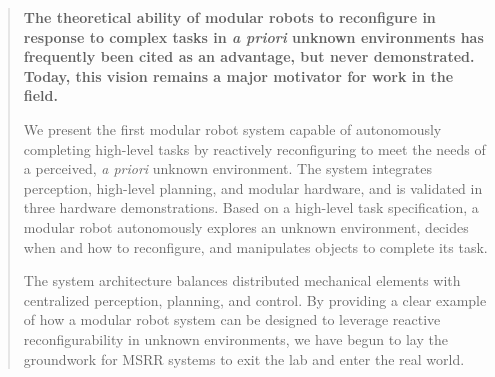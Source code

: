\documentclass[12pt]{article}
\newenvironment{sciabstract}{%
\begin{quote} \bf}
{\end{quote}}
\begin{document}



\maketitle 

%
\begin{sciabstract}
%
The theoretical ability of modular robots to reconfigure in response to complex tasks in \textit{a priori} unknown environments has frequently been cited as an advantage, but never demonstrated. Today, this vision remains a major motivator for work in the field.

We present the first modular robot system capable of autonomously completing high-level tasks by reactively reconfiguring to meet the needs of a perceived, \textit{a priori} unknown environment.  The system integrates perception, high-level planning, and modular hardware, and is validated in three hardware demonstrations. Based on a high-level task specification, a modular robot autonomously explores an unknown environment, decides when and how to reconfigure, and manipulates objects to complete its task.

The system architecture balances distributed mechanical elements with centralized perception, planning, and control.  By providing a clear example of how a modular robot system can be designed to leverage reactive reconfigurability in unknown environments, we have begun to lay the groundwork for MSRR systems to exit the lab and enter the real world.
%
\end{sciabstract}
\end{document}
